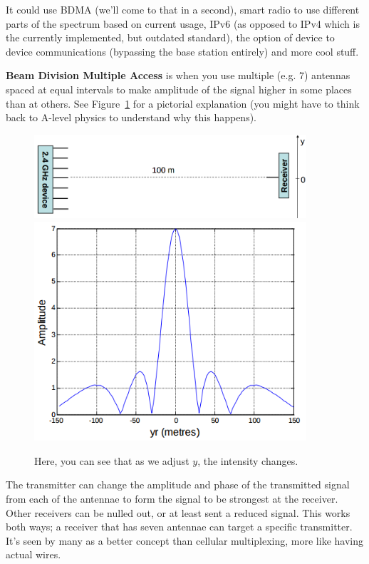 It could use BDMA (we'll come to that in a second), smart radio to use different
parts of the spectrum based on current usage, IPv6 (as opposed to IPv4 which is
the currently implemented, but outdated standard), the option of device to
device communications (bypassing the base station entirely) and more cool stuff.


\textbf{Beam Division Multiple Access} is when you use multiple (e.g. 7)
antennas spaced at equal intervals to make amplitude of the signal higher in
some places than at others. See Figure~\ref{BDMA} for a pictorial explanation
(you might have to think back to A-level physics to understand why this
happens).

\begin{figure}[H]
  \includegraphics[width=0.9\textwidth]{images/beam-forming}
  \includegraphics[width=0.9\textwidth]{images/beam-forming-intensity}
  \caption{Here, you can see that as we adjust $y$, the intensity changes.}
  \label{BDMA}
\end{figure}

The transmitter can change the amplitude and phase of the transmitted signal
from each of the antennae to form the signal to be strongest at the receiver.
Other receivers can be nulled out, or at least sent a reduced signal. This works
both ways; a receiver that has seven antennae can target a specific transmitter.
It's seen by many as a better concept than cellular multiplexing, more like
having actual wires.

